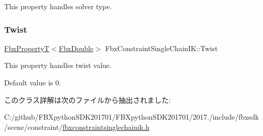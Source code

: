 This property handles solver type. \mbox{\label{class_fbx_constraint_single_chain_i_k_a3756b61ba9a55d15c00229fc9a670e4e}} 
\subsubsection{\texorpdfstring{Twist}{Twist}}
{\footnotesize\ttfamily \hyperlink{class_fbx_property_t}{Fbx\+PropertyT}$<$\hyperlink{fbxtypes_8h_a171e72a1c46fc15c1a6c9c31948c1c5b}{Fbx\+Double}$>$ Fbx\+Constraint\+Single\+Chain\+I\+K\+::\+Twist}

This property handles twist value.

Default value is 0. 

このクラス詳解は次のファイルから抽出されました\+:\begin{DoxyCompactItemize}
\item 
C\+:/github/\+F\+B\+Xpython\+S\+D\+K201701/\+F\+B\+Xpython\+S\+D\+K201701/2017./include/fbxsdk/scene/constraint/\hyperlink{fbxconstraintsinglechainik_8h}{fbxconstraintsinglechainik.\+h}\end{DoxyCompactItemize}
